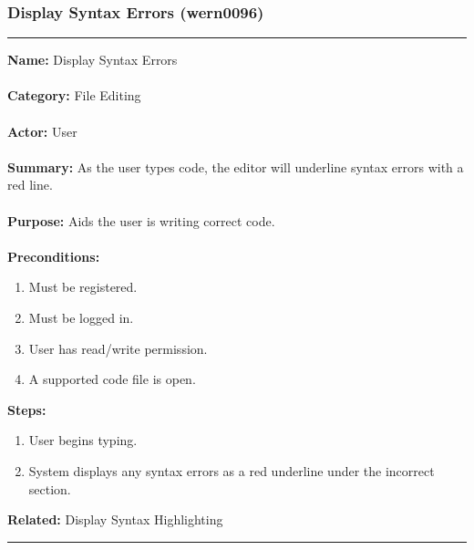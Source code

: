 \documentclass[11pt]{report}
\begin{document}
\subsubsection{Display Syntax Errors (wern0096)}
\vspace{2pt}
\hrule
\vspace{8pt}
	\noindent\textbf{Name:} Display Syntax Errors \\ \\
	\textbf{Category:} File Editing \\ \\
	\textbf{Actor:} User \\ \\
	\textbf{Summary:} As the user types code, the editor will underline syntax errors with a red line. \\ \\
	\textbf{Purpose:} Aids the user is writing correct code. \\ \\
	\textbf{Preconditions:} 
	\begin{enumerate}
		\item Must be registered.
		\item Must be logged in.
		\item User has read/write permission.
		\item A supported code file is open.
	\end{enumerate}
	\textbf{Steps:}
	\begin{enumerate}
		\item User begins typing.
		\item System displays any syntax errors as a red underline under the incorrect section.
	\end{enumerate}
	\textbf{Related:} Display Syntax Highlighting
\vspace{8pt}
\hrule
\newpage
\end{document}
